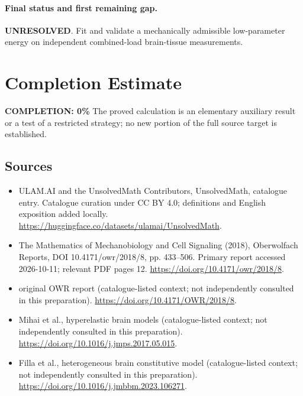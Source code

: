 \documentclass[11pt]{article}
\begin{document}
\paragraph{Final status and first remaining gap.}
\textbf{UNRESOLVED}. Fit and validate a mechanically admissible low-parameter energy on independent combined-load brain-tissue measurements.

\section{Completion Estimate}
\noindent\textbf{COMPLETION: 0\%}
The proved calculation is an elementary auxiliary result or a test of a restricted strategy; no new portion of the full source target is established.

\subsection{Sources}
\begin{itemize}
\item[\hypertarget{source:statement:1}{S1}] ULAM.AI and the UnsolvedMath Contributors, UnsolvedMath, catalogue entry. Catalogue curation under CC BY 4.0; definitions and English exposition added locally.
\url{https://huggingface.co/datasets/ulamai/UnsolvedMath}.
\item[\hypertarget{source:statement:2}{S2}] The Mathematics of Mechanobiology and Cell Signaling (2018), Oberwolfach Reports, DOI 10.4171/owr/2018/8, pp. 433--506. Primary report accessed 2026-10-11; relevant PDF pages 12.
\url{https://doi.org/10.4171/owr/2018/8}.
\item[\hypertarget{source:statement:3}{S3}] original OWR report (catalogue-listed context; not independently consulted in this preparation).
\url{https://doi.org/10.4171/OWR/2018/8}.
\item[\hypertarget{source:statement:4}{S4}] Mihai et al., hyperelastic brain models (catalogue-listed context; not independently consulted in this preparation).
\url{https://doi.org/10.1016/j.jmps.2017.05.015}.
\item[\hypertarget{source:statement:5}{S5}] Filla et al., heterogeneous brain constitutive model (catalogue-listed context; not independently consulted in this preparation).
\url{https://doi.org/10.1016/j.jmbbm.2023.106271}.
\end{itemize}
\label{end:statement}
\end{document}
